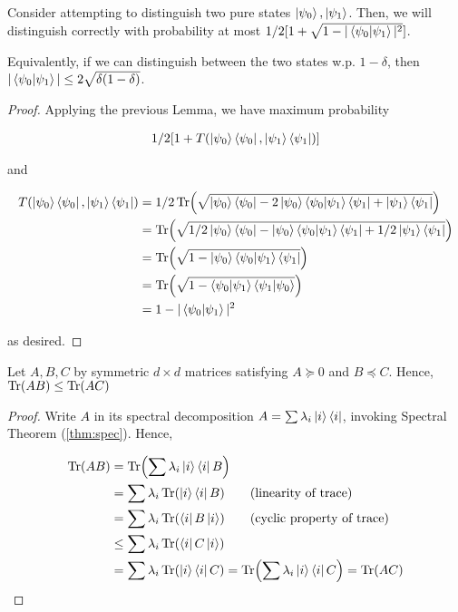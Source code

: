 \documentclass[main.tex]{subfiles}
\begin{document}
\begin{subappendices}
\begin{corollary}
\label{cor:distinguish-two-pure-states}
Consider attempting to distinguish two pure states $\ket{\psi_0}, \ket{\psi_1}$. Then, we will distinguish correctly with probability at most $1/2[1 + \sqrt{1 - |\bra{\psi_0}\ket{\psi_1}|^2}]$.

Equivalently, if we can distinguish between the two states w.p. $1 - \delta$, then $|\bra{\psi_0}\ket{\psi_1}| \leq 2\sqrt{\delta(1-\delta)}$. 	
\end{corollary}

\begin{proof}
Applying the previous Lemma, we have maximum probability

\begin{align*}
1/2[1 + T(\ket{\psi_0}\bra{\psi_0}, \ket{\psi_1}\bra{\psi_1}	)]
\end{align*}

and 

\begin{align*}
T(\ket{\psi_0}\bra{\psi_0}, \ket{\psi_1}\bra{\psi_1}	) &= 1/2\Tr(\sqrt{\ket{\psi_0}\bra{\psi_0} - 2\ket{\psi_0}\bra{\psi_0}\ket{\psi_1}\bra{\psi_1} + \ket{\psi_1}\bra{\psi_1}})\\
&= \Tr(\sqrt{1/2\ket{\psi_0}\bra{\psi_0} - \ket{\psi_0}\bra{\psi_0}\ket{\psi_1}\bra{\psi_1} + 1/2\ket{\psi_1}\bra{\psi_1}}) \\
&= \Tr(\sqrt{1 - \ket{\psi_0}\bra{\psi_0}\ket{\psi_1}\bra{\psi_1}}) \\
&= \Tr(\sqrt{1 - \bra{\psi_0}\ket{\psi_1}\bra{\psi_1}\ket{\psi_0}}) \\
&= 1 - |\bra{\psi_0}\ket{\psi_1}|^2
\end{align*}

as desired.
\end{proof}


\begin{lemma}
\label{lem:psd-trace}
Let $A, B, C$ by symmetric $d \times d$ matrices satisfying $A \succeq 0$ and $B \preceq C$. Hence, $\Tr(AB) \leq \Tr(AC)$

\begin{proof}
	Write $A$ in its spectral decomposition $A = \sum \lambda_i \ket{i}\bra{i}$, invoking Spectral Theorem (\ref{thm:spec}). Hence,
	
	\begin{align*}
		\Tr(AB) &= \Tr(\sum \lambda_i \ket{i}\bra{i} B)\\
		&= \sum \lambda_i \Tr(\ket{i}\bra{i} B) \tag{linearity of trace}\\
		&= \sum \lambda_i \Tr(\bra{i} B \ket{i}) \tag{cyclic property of trace}\\
		&\leq \sum \lambda_i \Tr(\bra{i} C \ket{i})\\
		&= \sum \lambda_i \Tr(\ket{i}\bra{i} C) = \Tr(\sum \lambda_i \ket{i}\bra{i} C) = \Tr(AC)
	\end{align*}
\end{proof}
\end{lemma}


\end{subappendices}
\end{document}
